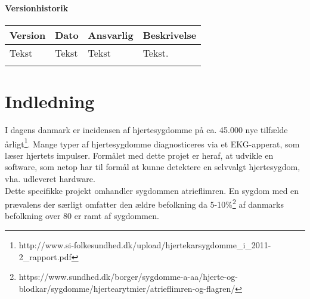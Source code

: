\subsubsection{Versionhistorik}

\begin{longtabu} to 
    Version &    Dato &    Ansvarlig &    Beskrivelse\\[-1ex]
    \midrule
    Tekst &    Tekst &    Tekst &    Tekst.\\
\label{version_Systemark}
\end{longtabu}

\chapter{Indledning}
I dagens danmark er incidensen af hjertesygdomme på ca. 45.000 nye tilfælde årligt\footnote{http://www.si-folkesundhed.dk/upload/hjertekarsygdomme\_i\_2011-2\_rapport.pdf}. Mange typer af hjertesygdomme diagnosticeres via et EKG-apperat, som læser hjertets impulser. Formålet med dette projet er heraf, at udvikle en software, som netop har til formål at kunne detektere en selvvalgt hjertesygdom, vha. udleveret hardware.\\
Dette specifikke projekt omhandler sygdommen atrieflimren. En sygdom med en  prævalens der særligt omfatter den ældre befolkning da 5-10\%\footnote{https://www.sundhed.dk/borger/sygdomme-a-aa/hjerte-og-blodkar/sygdomme/hjertearytmier/atrieflimren-og-flagren/} af danmarks befolkning over 80 er ramt af sygdommen. \\

